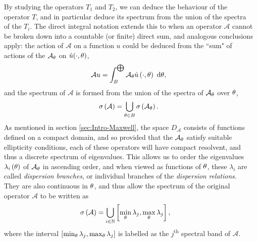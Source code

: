 By studying the operators $T_1$ and $T_2$, we can deduce the behaviour of the operator $T$, and in particular deduce its spectrum from the union of the spectra of the $T_i$.
The direct integral notation extends this to when an operator $\mathcal{A}$ cannot be broken down into a countable (or finite) direct sum, and analogous conclusions apply: the action of $\mathcal{A}$ on a function $u$ could be deduced from the ``sum" of actions of the $\mathcal{A}_{\theta}$ on $\hat{u}(\cdot,\theta)$,
\begin{align*}
	\mathcal{A}u = \int_{B}^{\bigoplus}\mathcal{A}_{\theta}\hat{u}\left( \cdot,\theta \right) \ \mathrm{d}\theta,
\end{align*}
and the spectrum of $\mathcal{A}$ is formed from the union of the spectra of $\mathcal{A}_{\theta}$ over $\theta$, 
\begin{align*}
	\sigma\left( \mathcal{A} \right) = \bigcup_{\theta\in B}\sigma\left( \mathcal{A}_{\theta} \right).
\end{align*}
As mentioned in section \ref{sec:Intro-Maxwell}, the space $D_{\mathcal{A}}$ consists of functions defined on a compact domain, and so provided that the $\mathcal{A}_{\theta}$ satisfy suitable ellipticity conditions, each of these operators will have compact resolvent, and thus a discrete spectrum of eigenvalues.
This allows us to order the eigenvalues $\lambda_i\left( \theta \right)$ of $\mathcal{A}_{\theta}$ in ascending order, and when viewed as functions of $\theta$, these $\lambda_i$ are called \emph{dispersion branches}, or individual branches of the \emph{dispersion relations}.
They are also continuous in $\theta$, and thus allow the spectrum of the original operator $\mathcal{A}$ to be written as
\begin{align*}
	\sigma\left( \mathcal{A} \right) &= \bigcup_{i\in\mathbb{N}}\left[  \min_{\theta}\lambda_j, \max_{\theta}\lambda_j  \right],
\end{align*}
where the interval $\left[  \min_{\theta}\lambda_j, \max_{\theta}\lambda_j  \right]$ is labelled as the $j^{\text{th}}$ spectral band of $\mathcal{A}$.

